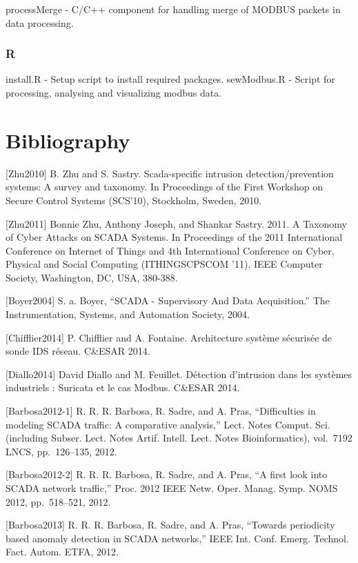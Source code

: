 \documentclass[12pt,]{article}
\begin{document}
processMerge - C/C++ component for handling merge of MODBUS packets in
data processing.

\subsubsection{R}\label{r}

install.R - Setup script to install required packages. sewModbus.R -
Script for processing, analysing and visualizing modbus data.

\newpage

\section*{Bibliography}\label{bibliography}

{[}Zhu2010{]} B. Zhu and S. Sastry. Scada-specific intrusion
detection/prevention systems: A survey and taxonomy. In Proceedings of
the First Workshop on Secure Control Systems (SCS'10), Stockholm,
Sweden, 2010.

{[}Zhu2011{]} Bonnie Zhu, Anthony Joseph, and Shankar Sastry. 2011. A
Taxonomy of Cyber Attacks on SCADA Systems. In Proceedings of the 2011
International Conference on Internet of Things and 4th International
Conference on Cyber, Physical and Social Computing (ITHINGSCPSCOM '11).
IEEE Computer Society, Washington, DC, USA, 380-388.

{[}Boyer2004{]} S. a. Boyer, ``SCADA - Supervisory And Data
Acquisition.'' The Instrumentation, Systems, and Automation Society,
2004.

{[}Chifflier2014{]} P. Chifflier and A. Fontaine. Architecture système
sécurisée de sonde IDS réseau. C\&ESAR 2014.

{[}Diallo2014{]} David Diallo and M. Feuillet. Détection d'intrusion
dans les systèmes industriels : Suricata et le cas Modbus. C\&ESAR 2014.

{[}Barbosa2012-1{]} R. R. R. Barbosa, R. Sadre, and A. Pras,
``Difficulties in modeling SCADA traffic: A comparative analysis,''
Lect. Notes Comput. Sci. (including Subser. Lect. Notes Artif. Intell.
Lect. Notes Bioinformatics), vol.~7192 LNCS, pp.~126--135, 2012.

{[}Barbosa2012-2{]} R. R. R. Barbosa, R. Sadre, and A. Pras, ``A first
look into SCADA network traffic,'' Proc. 2012 IEEE Netw. Oper. Manag.
Symp. NOMS 2012, pp.~518--521, 2012.

{[}Barbosa2013{]} R. R. R. Barbosa, R. Sadre, and A. Pras, ``Towards
periodicity based anomaly detection in SCADA networks,'' IEEE Int. Conf.
Emerg. Technol. Fact. Autom. ETFA, 2012.
\end{document}
